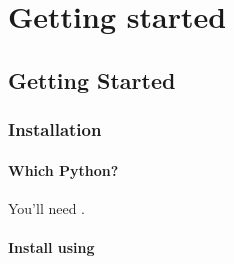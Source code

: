 \documentclass[letterpaper,10pt,english,openany,oneside]{sphinxmanual}
\begin{document}
\chapter{Getting started}
\label{\detokenize{index:id1}}
\sphinxstepscope


\section{Getting Started}
\label{\detokenize{getting_started/index:getting-started}}\label{\detokenize{getting_started/index::doc}}
\sphinxstepscope


\subsection{Installation}
\label{\detokenize{getting_started/installation:installation}}\label{\detokenize{getting_started/installation::doc}}

\subsubsection{Which Python?}
\label{\detokenize{getting_started/installation:which-python}}\label{\detokenize{getting_started/installation:id1}}
\sphinxAtStartPar
You’ll need .


\subsubsection{Install using }
\label{\detokenize{getting_started/installation:install-using-pip}}
\sphinxAtStartPar
{}
\end{document}
